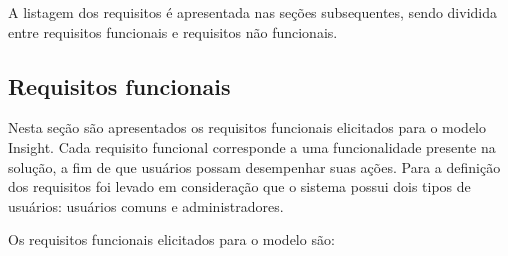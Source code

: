 \documentclass[english,brazilian]{UNISINOSmonografia}
\begin{document}
A listagem dos requisitos é apresentada nas seções subsequentes, sendo dividida entre requisitos funcionais e requisitos não funcionais.

\subsection{Requisitos funcionais} 
Nesta seção são apresentados os requisitos funcionais elicitados para o modelo Insight. Cada requisito funcional corresponde a uma funcionalidade presente na solução, a fim de que usuários possam desempenhar suas ações. Para a definição dos requisitos foi levado em consideração que o sistema possui dois tipos de usuários: usuários comuns e administradores.

Os requisitos funcionais elicitados para o modelo são:
\end{document}
